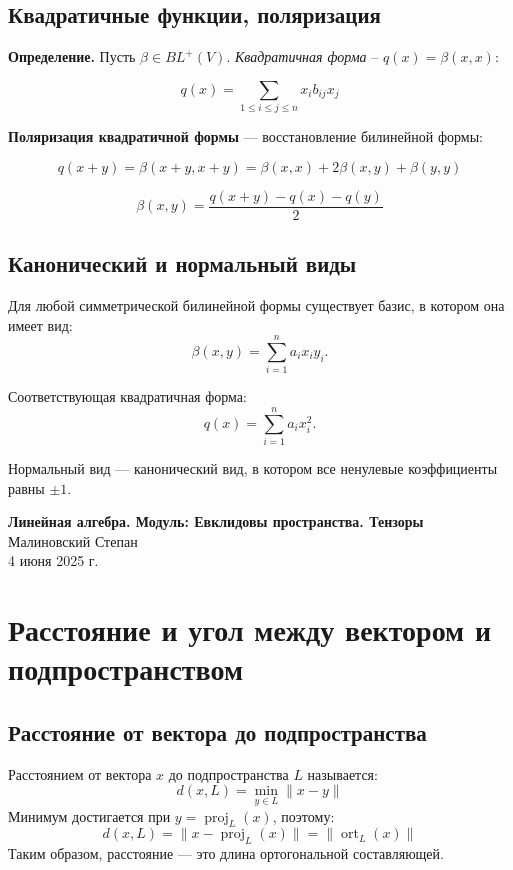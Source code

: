 \documentclass[12pt]{article}
\begin{document}
\subsection{Квадратичные функции, поляризация}

\textbf{Определение.} Пусть $\beta \in BL^+(V).$ \textit{Квадратичная форма} – $q(x)=\beta(x,x)$:

$$
q(x) =\sum_{1 \leq i \leq j \leq n}{x_i b_{ij}x_j}
$$

\textbf{Поляризация квадратичной формы} — восстановление билинейной формы:

$$
q(x + y) = \beta(x + y, x + y)
         = \beta(x, x) + 2\beta(x, y) + \beta(y, y)
$$

$$
\beta(x, y) = \frac{q(x + y) - q(x) - q(y)}{2}
$$

\subsection{Канонический и нормальный виды}

Для любой симметрической билинейной формы существует базис, в котором она имеет вид:
$$
\beta(x, y) = \sum_{i=1}^n a_i x_i y_i.
$$

Соответствующая квадратичная форма:
$$
q(x) = \sum_{i=1}^n a_i x_i^2.
$$

Нормальный вид — канонический вид, в котором все ненулевые коэффициенты равны $\pm 1$.
\begin{center}
    {\LARGE \textbf{Линейная алгебра. Модуль: Евклидовы пространства. Тензоры}}\\
    \vspace{0.3em}
    Малиновский Степан\\
    \vspace{0.3em}
    4 июня 2025 г.
\end{center}

\section{Расстояние и угол между вектором и подпространством}

\subsection*{Расстояние от вектора до подпространства}
Расстоянием от вектора $x$ до подпространства $L$ называется:
\[
d(x, L) = \min_{y \in L} \|x - y\|
\]
Минимум достигается при $y = \operatorname{proj}_L(x)$, поэтому:
\[
d(x, L) = \|x - \operatorname{proj}_L(x)\| = \|\operatorname{ort}_L(x)\|
\]
Таким образом, расстояние — это длина ортогональной составляющей.
\end{document}
